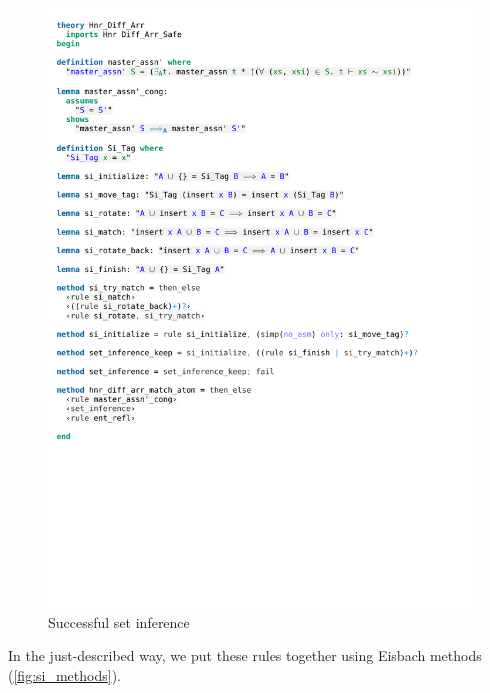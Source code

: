 \begin{figure}[!htpb]
    \includegraphics[trim={0 16,5cm 0 12,7cm}, clip, width=1.00\textwidth]{figures/Theory_Hnr_Diff_Arr_SI.pdf}
    \caption[Successful set inference]{Successful set inference}
    \label{fig:si_finish}
\end{figure}

\noindent In the just-described way, we put these rules together using Eisbach methods (\autoref{fig:si_methods}).

